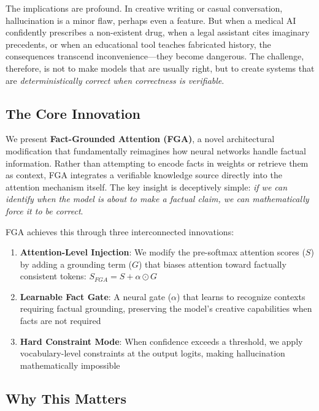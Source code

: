 \documentclass[11pt, a4paper]{article}
\theoremstyle{definition}
\begin{document}
The implications are profound. In creative writing or casual conversation, hallucination is a minor flaw, perhaps even a feature. But when a medical AI confidently prescribes a non-existent drug, when a legal assistant cites imaginary precedents, or when an educational tool teaches fabricated history, the consequences transcend inconvenience—they become dangerous. The challenge, therefore, is not to make models that are usually right, but to create systems that are \textit{deterministically correct when correctness is verifiable}.

\subsection{The Core Innovation}

We present \textbf{Fact-Grounded Attention (FGA)}, a novel architectural modification that fundamentally reimagines how neural networks handle factual information. Rather than attempting to encode facts in weights or retrieve them as context, FGA integrates a verifiable knowledge source directly into the attention mechanism itself. The key insight is deceptively simple: \textit{if we can identify when the model is about to make a factual claim, we can mathematically force it to be correct}.

FGA achieves this through three interconnected innovations:

\begin{enumerate}
    \item \textbf{Attention-Level Injection}: We modify the pre-softmax attention scores ($S$) by adding a grounding term ($G$) that biases attention toward factually consistent tokens: $S_{FGA} = S + \alpha \odot G$
    
    \item \textbf{Learnable Fact Gate}: A neural gate ($\alpha$) that learns to recognize contexts requiring factual grounding, preserving the model's creative capabilities when facts are not required
    
    \item \textbf{Hard Constraint Mode}: When confidence exceeds a threshold, we apply vocabulary-level constraints at the output logits, making hallucination mathematically impossible
\end{enumerate}

\subsection{Why This Matters}
\end{document}
